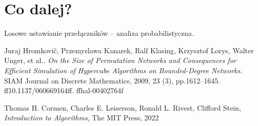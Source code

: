 \documentclass[a4paper]{article}
\theoremstyle{definition}
\begin{document}

\section{Co dalej?}

Losowe ustawianie przełączników -- analiza probabilistyczna. 


\begin{thebibliography}{9}
Juraj Hromkovič, Przemyslawa Kanarek, Ralf Klasing, Krzysztof Lorys, Walter Unger, et al.. \emph{On the Size of Permutation Networks and Consequences for Efficient Simulation of Hypercube Algorithms on Bounded-Degree Networks}. SIAM Journal on Discrete Mathematics, 2009, 23 (3), pp.1612–1645. ff10.1137/060669164ff. ffhal-00402764f

Thomas H. Cormen, Charles E. Leiserson, Ronald L. Rivest, Clifford Stein, \emph{Introduction to Algorithms}, The MIT Press, 2022
\end{thebibliography}
\end{document}
